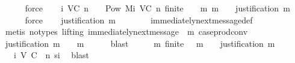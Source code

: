 \begin{isabellebody}
\ \ \ \ \isamarkupfalse%
\ force\isanewline
\isanewline
\ \ \isamarkupfalse%
\ {\isachardoublequoteopen}{\isasymSigma}{\isacharunderscore}i\ {\isacharparenleft}V{\isacharcomma}C{\isacharcomma}{\isasymepsilon}{\isacharparenright}\ {\isacharparenleft}n{\isacharplus}{}{\isacharparenright}\ {\isacharequal}\ {\isacharbraceleft}{\isasymsigma}\ {\isasymin}\ Pow\ {\isacharparenleft}M{\isacharunderscore}i\ {\isacharparenleft}V{\isacharcomma}C{\isacharcomma}{\isasymepsilon}{\isacharparenright}\ n{\isacharparenright}{\isachardot}\ finite\ {\isasymsigma}\ {\isasymand}\ {\isacharparenleft}{\isasymforall}\ m{\isachardot}\ m\ {\isasymin}\ {\isasymsigma}\ {\isasymlongrightarrow}\ justification\ m\ {\isasymsubseteq}\ {\isasymsigma}{\isacharparenright}{\isacharbraceright}{\isachardoublequoteclose}\isanewline
\ \ \ \ \isamarkupfalse%
\ force\isanewline
\isanewline
\ \ \isamarkupfalse%
\ {\isachardoublequoteopen}justification\ m\ {\isasymsubseteq}\ {\isasymsigma}{\isachardoublequoteclose}\isanewline
\ \ \ \ \isamarkupfalse%
\ immediately{\isacharunderscore}next{\isacharunderscore}message{\isacharunderscore}def\isanewline
\ \ \ \ \isamarkupfalse%
\ {\isacharparenleft}metis\ {\isacharparenleft}no{\isacharunderscore}types{\isacharcomma}\ lifting{\isacharparenright}\ {\isacartoucheopen}immediately{\isacharunderscore}next{\isacharunderscore}message\ {\isacharparenleft}{\isasymsigma}{\isacharcomma}\ m{\isacharparenright}{\isacartoucheclose}\ case{\isacharunderscore}prod{\isacharunderscore}conv{\isacharparenright}\isanewline
\ \ \isamarkupfalse%
\ {\isachardoublequoteopen}justification\ m\ {\isasymsubseteq}\ {\isasymsigma}\ {\isasymunion}\ {\isacharbraceleft}m{\isacharbraceright}{\isachardoublequoteclose}\isanewline
\ \ \ \ \isamarkupfalse%
\ blast\isanewline
\ \ \isamarkupfalse%
\ \isamarkupfalse%
\ {\isachardoublequoteopen}{\isasymAnd}m{\isacharprime}{\isachardot}\ finite\ {\isasymsigma}\ {\isasymand}\ m{\isacharprime}\ {\isasymin}\ {\isasymsigma}\ {\isasymLongrightarrow}\ justification\ m{\isacharprime}\ {\isasymsubseteq}\ {\isasymsigma}{\isachardoublequoteclose}\isanewline
\ \ \ \ \isamarkupfalse%
\ {\isacartoucheopen}{\isasymsigma}\ {\isasymin}\ {\isasymSigma}{\isacharunderscore}i\ {\isacharparenleft}V{\isacharcomma}\ C{\isacharcomma}\ {\isasymepsilon}{\isacharparenright}\ n{\isacartoucheclose}\ si\ \isamarkupfalse%
\ blast\isanewline
\ \ \isamarkupfalse%

\end{isabellebody}
